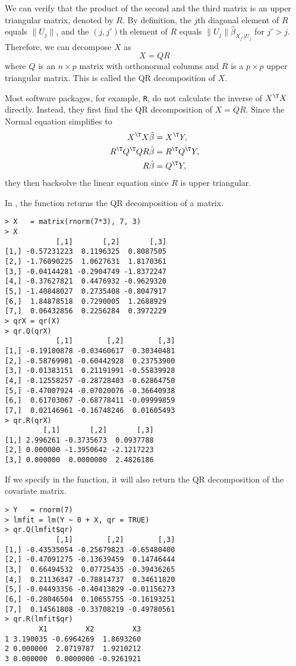 We can verify that the product of the second and the third matrix is an upper triangular matrix, denoted by $R$. By definition, the $j$th diagonal element of $R$ equals $\|  U_j \|$, and the $(j, j')$th element of $R$ equals $\|  U_j \|  \hat{\beta}_{X_{j'}|U_j} $ for $j' > j.$
Therefore, we can decompose $X$ as
$$
X = QR
$$
where $Q$ is an $n\times p$ matrix with orthonormal columns and $R$ is a $p\times p$ upper triangular matrix. This is called the QR decomposition of $X$. 



Most software packages, for example, \texttt{R}, do not calculate the inverse of $X^{\T} X$ directly. Instead, they first find the QR decomposition of $X = QR$. Since the Normal equation simplifies to 
\begin{align*}
X^{\T}X\hat{\beta} & =X^{\T}Y,\\
R^{\T}Q^{\T}QR\hat{\beta} & =R^{\T}Q^{\T}Y,\\
R\hat{\beta} & =Q^{\T}Y,
\end{align*}
they then backsolve the linear equation since $R$ is upper triangular. 



In , the  function returns the QR decomposition of a matrix. 

\begin{lstlisting}
> X   = matrix(rnorm(7*3), 7, 3)
> X
            [,1]       [,2]       [,3]
[1,] -0.57231223  0.1196325  0.8087505
[2,] -1.76090225  1.0627631  1.8170361
[3,] -0.04144281 -0.2904749 -1.8372247
[4,] -0.37627821  0.4476932 -0.9629320
[5,] -1.40848027  0.2735408 -0.8047917
[6,]  1.84878518  0.7290005  1.2688929
[7,]  0.06432856  0.2256284  0.3972229
> qrX = qr(X)
> qr.Q(qrX)
            [,1]        [,2]        [,3]
[1,] -0.19100878 -0.03460617  0.30340481
[2,] -0.58769981 -0.60442928  0.23753900
[3,] -0.01383151  0.21191991 -0.55839928
[4,] -0.12558257 -0.28728403 -0.62864750
[5,] -0.47007924 -0.07020076 -0.36640938
[6,]  0.61703067 -0.68778411 -0.09999859
[7,]  0.02146961 -0.16748246  0.01605493
> qr.R(qrX)
         [,1]       [,2]       [,3]
[1,] 2.996261 -0.3735673  0.0937788
[2,] 0.000000 -1.3950642 -2.1217223
[3,] 0.000000  0.0000000  2.4826186
\end{lstlisting}


If we specify  in the  function, it will also return the QR decomposition of the covariate matrix. 

\begin{lstlisting}
> Y   = rnorm(7)
> lmfit = lm(Y ~ 0 + X, qr = TRUE)
> qr.Q(lmfit$qr)
            [,1]        [,2]        [,3]
[1,] -0.43535054 -0.25679823 -0.65480400
[2,] -0.47091275 -0.13639459  0.14746444
[3,]  0.66494532  0.07725435 -0.39436265
[4,]  0.21136347 -0.78814737  0.34611820
[5,] -0.04493356 -0.40413829 -0.01156273
[6,] -0.28046504  0.10655755 -0.16193251
[7,]  0.14561808 -0.33708219 -0.49780561
> qr.R(lmfit$qr)
        X1         X2         X3
1 3.190035 -0.6964269  1.8693260
2 0.000000  2.0719787  1.9210212
3 0.000000  0.0000000 -0.9261921
\end{lstlisting}

